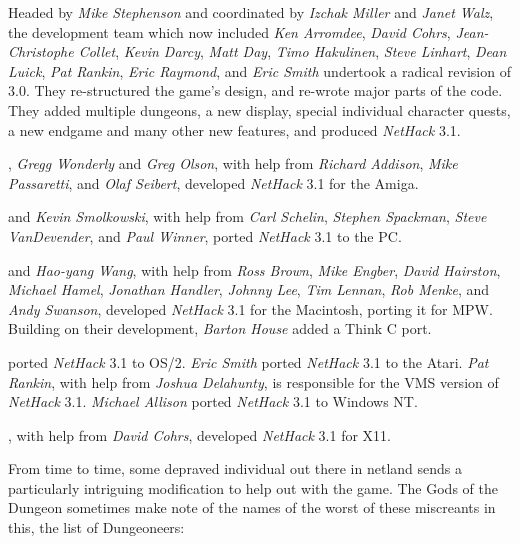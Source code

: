 \medskip
\nd Headed by {\it Mike Stephenson\/} and coordinated by {\it Izchak Miller\/} and
{\it Janet Walz}, the development team which now included {\it Ken Arromdee},
{\it David Cohrs}, {\it Jean-Christophe Collet}, {\it Kevin Darcy},
{\it Matt Day}, {\it Timo Hakulinen}, {\it Steve Linhart}, {\it Dean Luick},
{\it Pat Rankin}, {\it Eric Raymond}, and {\it Eric Smith\/} undertook a radical
revision of 3.0.  They re-structured the game's design, and re-wrote major
parts of the code.  They added multiple dungeons, a new display, special
individual character quests, a new endgame and many other new features, and
produced {\it NetHack\/} 3.1.

\medskip
{}, {\it Gregg Wonderly\/} and {\it Greg Olson}, with help
from {\it Richard Addison}, {\it Mike Passaretti}, and {\it Olaf Seibert},
developed {\it NetHack\/} 3.1 for the Amiga.

\medskip
{} and {\it Kevin Smolkowski}, with help from
{\it Carl Schelin}, {\it Stephen Spackman}, {\it Steve VanDevender},
and {\it Paul Winner}, ported {\it NetHack\/} 3.1 to the PC.

\medskip
{} and {\it Hao-yang Wang},
with help from {\it Ross Brown}, {\it Mike Engber}, {\it David Hairston},
{\it Michael Hamel}, {\it Jonathan Handler}, {\it Johnny Lee},
{\it Tim Lennan}, {\it Rob Menke}, and {\it Andy Swanson},
developed {\it NetHack\/} 3.1 for the Macintosh, porting it for MPW.
Building on their development, {\it Barton House} added a Think C port.

\medskip
{} ported {\it NetHack\/} 3.1 to OS/2.
{\it Eric Smith\/} ported {\it NetHack\/} 3.1 to the Atari.
{\it Pat Rankin}, with help from {\it Joshua Delahunty},
is responsible for the VMS version of {\it NetHack\/} 3.1.
{\it Michael Allison} ported {\it NetHack\/} 3.1 to Windows NT.

\medskip
{}, with help from {\it David Cohrs}, developed {\it NetHack\/}
3.1 for X11.

\bigskip
\nd From time to time, some depraved individual out there in netland sends a
particularly intriguing modification to help out with the game.  The Gods of
the Dungeon sometimes make note of the names of the worst of these miscreants
in this, the list of Dungeoneers:

